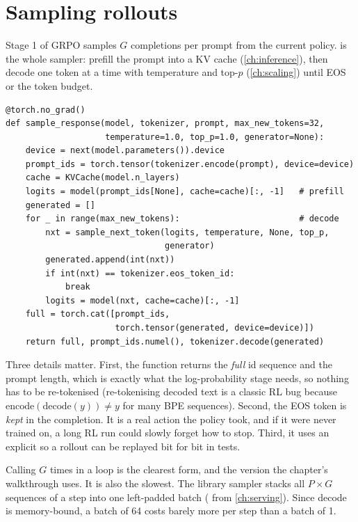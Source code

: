 \section{Sampling rollouts}\label{sec:grpo:rollouts}

Stage 1 of GRPO samples $G$ completions per prompt from the current policy.
 is the whole sampler: prefill the prompt into a KV cache
(\cref{ch:inference}), then decode one token at a time with temperature and top-$p$
(\cref{ch:scaling}) until EOS or the token budget.

\begin{lstlisting}[caption={Unbatched rollout sampler (\texttt{labs/lab25\_grpo/solution.py}).},label={lst:grpo:sample}]
@torch.no_grad()
def sample_response(model, tokenizer, prompt, max_new_tokens=32,
                    temperature=1.0, top_p=1.0, generator=None):
    device = next(model.parameters()).device
    prompt_ids = torch.tensor(tokenizer.encode(prompt), device=device)
    cache = KVCache(model.n_layers)
    logits = model(prompt_ids[None], cache=cache)[:, -1]   # prefill
    generated = []
    for _ in range(max_new_tokens):                        # decode
        nxt = sample_next_token(logits, temperature, None, top_p,
                                generator)
        generated.append(int(nxt))
        if int(nxt) == tokenizer.eos_token_id:
            break
        logits = model(nxt, cache=cache)[:, -1]
    full = torch.cat([prompt_ids,
                      torch.tensor(generated, device=device)])
    return full, prompt_ids.numel(), tokenizer.decode(generated)
\end{lstlisting}

Three details matter. First, the function returns the \emph{full} id sequence and the
prompt length, which is exactly what the log-probability stage needs, so nothing has to be
re-tokenised (re-tokenising decoded text is a classic RL bug because
$\text{encode}(\text{decode}(y))\neq y$ for many BPE sequences). Second, the EOS token is
\emph{kept} in the completion. It is a real action the policy took, and if it were never
trained on, a long RL run could slowly forget how to stop. Third, it uses an explicit
 so a rollout can be replayed bit for bit in tests.

Calling  $G$ times in a loop is the clearest form, and the version the
chapter's walkthrough uses. It is also the slowest. The library sampler
 stacks all $P\times G$ sequences of a step into one
left-padded batch ( from \cref{ch:serving}). Since decode is
memory-bound, a batch of 64 costs barely more per step than a batch of 1.


